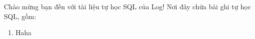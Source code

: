 Chào mừng bạn đến với tài liệu tự học SQL của Log! Nơi đây chứa bài ghi tự học SQL, gồm:

\begin{enumerate}
  \item Haha
\end{enumerate}
